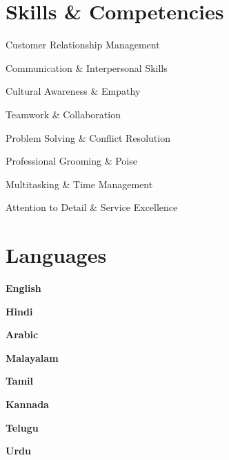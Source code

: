 \documentclass[a4paper,11pt]{article}
\begin{document}
\section{Skills \& Competencies}
\begin{itemize}[leftmargin=0.15in, label=\textbullet, itemsep=0pt]
	\small{
	\item Customer Relationship Management
	\item Communication \& Interpersonal Skills
	\item Cultural Awareness \& Empathy
	\item Teamwork \& Collaboration
	\item Problem Solving \& Conflict Resolution
	\item Professional Grooming \& Poise
	\item Multitasking \& Time Management
	\item Attention to Detail \& Service Excellence
		}
\end{itemize}

\section{Languages}
\begin{itemize}[leftmargin=0.15in, label={}, itemsep=1pt]
	\small{
	\item \textbf{English}
	\item \textbf{Hindi}
	\item \textbf{Arabic}
	\item \textbf{Malayalam}
	\item \textbf{Tamil}
	\item \textbf{Kannada}
	\item \textbf{Telugu}
	\item \textbf{Urdu}
		}
\end{itemize}
\end{document}
